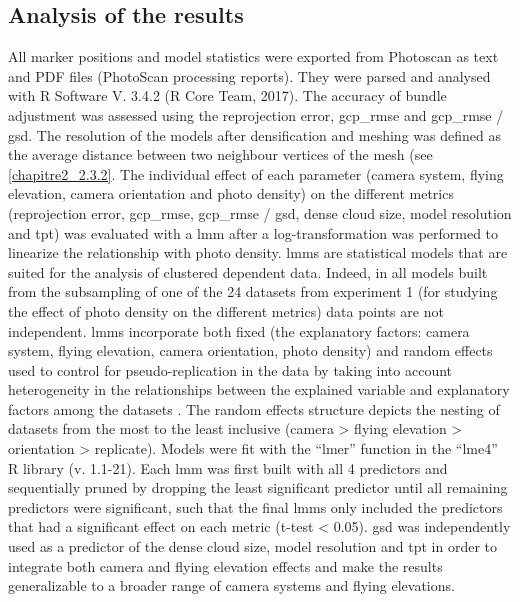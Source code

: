 \subsection{Analysis of the results}\label{chapitre2_2.4}
All marker positions and model statistics were exported from Photoscan as text and PDF files (PhotoScan processing reports). They were parsed and analysed with R Software V. 3.4.2 (R Core Team, 2017). The accuracy of bundle adjustment was assessed using the reprojection error, \acrshort{gcp_rmse} and \acrshort{gcp_rmse} / \acrshort{gsd}. The resolution of the models after densification and meshing was defined as the average distance between two neighbour vertices of the mesh (see \ref{chapitre2_2.3.2}. The individual effect of each parameter (camera system, flying elevation, camera orientation and photo density) on the different metrics (reprojection error, \acrshort{gcp_rmse}, \acrshort{gcp_rmse} / \acrshort{gsd}, dense cloud size, model resolution and \acrshort{tpt}) was evaluated with a \gls{lmm} \citep{zuur_mixed_2009} after a log-transformation was performed to linearize the relationship with photo density. \acrshort{lmm}s are statistical models that are suited for the analysis of clustered dependent data. Indeed, in all models built from the subsampling of one of the 24 datasets from experiment 1 (for studying the effect of photo density on the different metrics) data points are not independent. \acrshort{lmm}s incorporate both fixed (the explanatory factors: camera system, flying elevation, camera orientation, photo density) and random effects used to control for pseudo-replication in the data by taking into account heterogeneity in the relationships between the explained variable and explanatory factors among the datasets \citep{patino_accounting_2013}. The random effects structure depicts the nesting of datasets from the most to the least inclusive (camera > flying elevation > orientation > replicate). Models were fit with the “lmer” function in the “lme4” R library (v. 1.1-21). Each \acrshort{lmm} was first built with all 4 predictors and sequentially pruned by dropping the least significant predictor until all remaining predictors were significant, such that the final \acrshort{lmm}s only included the predictors that had a significant effect on each metric (t-test < 0.05). \acrshort{gsd} was independently used as a predictor of the dense cloud size, model resolution and \acrshort{tpt} in order to integrate both camera and flying elevation effects and make the results generalizable to a broader range of camera systems and flying elevations.

